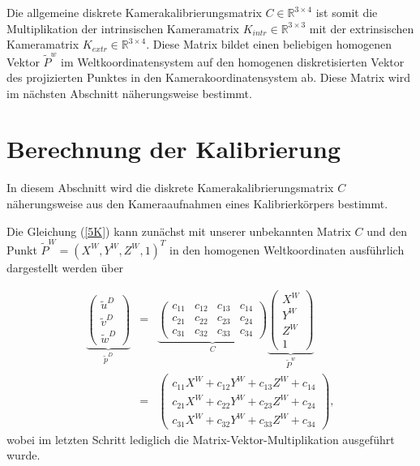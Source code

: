 {Die allgemeine diskrete Kamerakalibrierungsmatrix $C \in \mathbb{R}^{3 \times 4}$ 
ist somit die Multiplikation der intrinsischen Kameramatrix $K_{intr}\in \mathbb{R}^{3 \times 3}$ 
mit der extrinsischen Kameramatrix $K_{extr} \in \mathbb{R}^{3 \times 4}$.
Diese Matrix bildet einen beliebigen homogenen Vektor $\tilde P^w$ im Weltkoordinatensystem  
auf den homogenen diskretisierten Vektor des projizierten Punktes in den \linebreak Kamerakoordinatensystem ab.
Diese Matrix wird im nächsten Abschnitt näherungsweise bestimmt.

\section{Berechnung der Kalibrierung}

In diesem Abschnitt wird die diskrete Kamerakalibrierungsmatrix $C$ näherungsweise 
aus den Kameraaufnahmen eines Kalibrierkörpers \linebreak 
bestimmt.

Die Gleichung (\ref{5K}) kann zunächst mit unserer unbekannten Matrix $C$
und den Punkt $\tilde P^W=(X^W, Y^W, Z^W, 1)^T$  
in den homogenen Weltkoor\-dinaten ausführlich dargestellt werden über

\begin{eqnarray} \label{9K}
    \underbrace{
        \left (
        \begin{array}{c}
            \tilde u^D \\ \tilde v^D \\ \tilde w^D
        \end{array}
        \right )}_{\tilde {p}^D}
    & = & 
    \underbrace{	\left ( 
        \begin{array}{cccc}
            c_{11}  	& c_{12}  	& c_{13} 	& c_{14} \\ 
            c_{21}  	& c_{22} 	& c_{23}  	& c_{24}\\ 
            c_{31}  	& c_{32} 	& c_{33} 	& c_{34}
        \end{array}
        \right )}_{C}		
    \underbrace{
        \left (
        \begin{array}{c}
            X^W \\ Y^W \\ Z^W \\ 1
        \end{array}
        \right ) }_{\tilde P^w }
    \nonumber \\
    & = &
    \left ( 
    \begin{array}{c}
        c_{11}X^W +  c_{12}Y^W + c_{13} Z^W	+ c_{14} \\ 
        c_{21}X^W +  c_{22}Y^W + c_{23} Z^W + c_{24}\\ 
        c_{31}X^W +  c_{32}Y^W + c_{33} Z^W	+ c_{34}
    \end{array}
    \right ),
\end{eqnarray}
wobei im letzten Schritt lediglich die Matrix-Vektor-Multiplikation \linebreak ausgeführt wurde.

}
